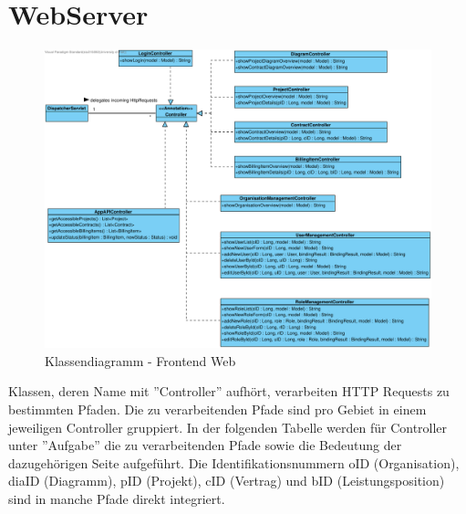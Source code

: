 
\section{WebServer}

\begin{figure}[h]
	\centering
	\includegraphics[width=\linewidth]{img/diagrams/Frontend Classes.pdf}
	\caption{Klassendiagramm - Frontend Web}
	\label{fig:klassendiagramm-web}
\end{figure}

\clearpage

\noindent
Klassen, deren Name mit ''Controller'' aufhört, verarbeiten HTTP Requests zu bestimmten Pfaden.
Die zu verarbeitenden Pfade sind pro Gebiet in einem jeweiligen Controller gruppiert.
In der folgenden Tabelle werden für Controller unter ''Aufgabe'' die zu verarbeitenden Pfade sowie die Bedeutung der dazugehörigen Seite aufgeführt.
Die Identifikationsnummern oID (Organisation), diaID (Diagramm), pID (Projekt), cID (Vertrag) und bID (Leistungsposition) sind in manche Pfade direkt integriert. \\

